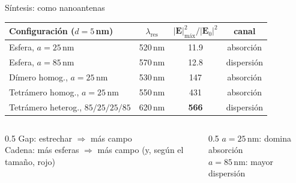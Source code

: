 \documentclass[aspectratio=43,11pt]{beamer}
\begin{document}
\begin{frame}{Síntesis: como nanoantenas}
  \vspace{2pt}
  \centering
  \renewcommand{\arraystretch}{1.15}\footnotesize
  \begin{tabular}{@{}lccc@{}}
    \toprule
    Configuración ($d=5$\,nm) & $\lambda_\text{res}$ & $|\mathbf{E}|^2_\text{máx}/|\mathbf{E}_0|^2$ & canal \\
    \midrule
    Esfera, $a=25$\,nm                  & 520\,nm & 11.9 & absorción \\
    Esfera, $a=85$\,nm                  & 570\,nm & 12.8 & dispersión \\
    Dímero homog., $a=25$\,nm           & 530\,nm & 147  & absorción \\
    Tetrámero homog., $a=25$\,nm        & 550\,nm & 431  & absorción \\
    \rowcolor{orosuave!55}
    Tetrámero heterog., $85/25/25/85$   & 620\,nm & \textbf{566} & dispersión \\
    \bottomrule
  \end{tabular}
  \vspace{8pt}
  \begin{columns}[c]
    \begin{column}{0.5\textwidth}
      \centering\footnotesize
      \alert{Gap}: estrechar $\Rightarrow$ más campo\\
      \alert{Cadena}: más esferas $\Rightarrow$ más campo (y, según el tamaño, rojo)
    \end{column}
    \begin{column}{0.5\textwidth}
      \centering\footnotesize
      $a=25$\,nm: domina \alert{absorción}\\
      $a=85$\,nm: mayor \alert{dispersión}
    \end{column}
  \end{columns}
\end{frame}
\end{document}
